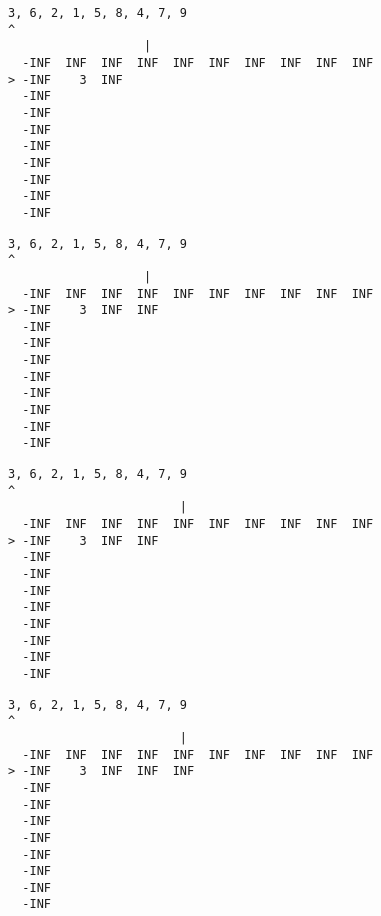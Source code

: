 { \begin{verbatim}
3, 6, 2, 1, 5, 8, 4, 7, 9
^
                   |
  -INF  INF  INF  INF  INF  INF  INF  INF  INF  INF
> -INF    3  INF                                   
  -INF                                             
  -INF                                             
  -INF                                             
  -INF                                             
  -INF                                             
  -INF                                             
  -INF                                             
  -INF                                             
\end{verbatim} }

{ \begin{verbatim}
3, 6, 2, 1, 5, 8, 4, 7, 9
^
                   |
  -INF  INF  INF  INF  INF  INF  INF  INF  INF  INF
> -INF    3  INF  INF                              
  -INF                                             
  -INF                                             
  -INF                                             
  -INF                                             
  -INF                                             
  -INF                                             
  -INF                                             
  -INF                                             
\end{verbatim} }

{ \begin{verbatim}
3, 6, 2, 1, 5, 8, 4, 7, 9
^
                        |
  -INF  INF  INF  INF  INF  INF  INF  INF  INF  INF
> -INF    3  INF  INF                              
  -INF                                             
  -INF                                             
  -INF                                             
  -INF                                             
  -INF                                             
  -INF                                             
  -INF                                             
  -INF                                             
\end{verbatim} }

{ \begin{verbatim}
3, 6, 2, 1, 5, 8, 4, 7, 9
^
                        |
  -INF  INF  INF  INF  INF  INF  INF  INF  INF  INF
> -INF    3  INF  INF  INF                         
  -INF                                             
  -INF                                             
  -INF                                             
  -INF                                             
  -INF                                             
  -INF                                             
  -INF                                             
  -INF                                             
\end{verbatim} }

